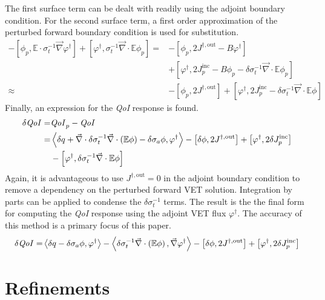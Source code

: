 \documentclass[12pt]{report}
\newcommand{\bra}{\left\langle}
\newcommand{\ket}{\right\rangle}
\newcommand{\sbra}{\left[}
\newcommand{\sket}{\right]}
\renewcommand{\div}{\vec{\nabla} \cdot}
\newcommand{\grad}{\vec{\nabla}}
\newcommand{\vefadj}{\varphi^\dag}
\newcommand{\Edd}{\mathbb{E}}
\newcommand{\siga}{\sigma_a}
\newcommand{\isigt}{\sigma_t^{-1}}
\newcommand{\scalSource}{q}
\newcommand{\qoi}{{\it QoI}\xspace}
\begin{document}
The first surface term can be dealt with readily using the adjoint boundary condition. For the second surface term, a first order approximation of the perturbed forward boundary condition is used for substitution.
\begin{equation}
\begin{split}
 - \sbra \phi_p, \Edd \cdot \isigt \grad \vefadj \sket  + \sbra \vefadj, \isigt \div \Edd \phi_p \sket 
=&- \sbra \phi_p, 2J^{\dag,\text{out}} - B \vefadj \sket \\ 
&+ \sbra \vefadj, 2 J_p^{\text{inc}} - B \phi_p - \delta \isigt \div \Edd \phi_p \sket \\
\approx&- \sbra \phi_p, 2J^{\dag,\text{out}} \sket + \sbra \vefadj, 2 J_p^{\text{inc}} - \delta \isigt \div \Edd \phi \sket 
\end{split}
\end{equation}
Finally, an expression for the \qoi response is found.
\begin{equation}
\label{QoIVETAdjlong}
\begin{split}
\delta \qoi =& \qoi_p - \qoi \\ 
=& \bra \delta \scalSource + \div \delta \isigt \div \left( \Edd \phi \right)  - \delta \siga \phi, \vefadj \ket 
- \sbra \delta \phi, 2J^{\dag,\text{out}} \sket + \sbra \vefadj, 2 \delta J_p^{\text{inc}} \sket \\
& - \sbra \vefadj, \delta \isigt \div \Edd \phi \sket 
\end{split}
\end{equation}
Again, it is advantageous to use $J^{\dag,\text{out}}=0$ in the adjoint boundary condition to remove a dependency on the 
perturbed forward VET solution. Integration by parts can be applied to condense the $\delta \isigt$ terms. The result is the the final form for computing the \qoi response using the adjoint VET flux $\vefadj$. The accuracy of this method is a primary focus of this paper.
\begin{equation}
\label{VETsens}
\begin{split}
\delta \qoi =&  \bra \delta \scalSource - \delta \siga \phi, \vefadj \ket  - \bra \delta \isigt \div \left( \Edd \phi \right) , \grad \vefadj \ket
- \sbra \delta \phi, 2J^{\dag,\text{out}} \sket + \sbra \vefadj, 2 \delta J_p^{\text{inc}} \sket \\
\end{split}
\end{equation}



\section{Refinements}
\end{document}
